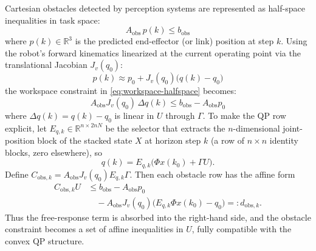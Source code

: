 Cartesian obstacles detected by perception systems are represented as
half-space inequalities in task space:
\begin{equation}
\label{eq:workspace-halfspace}
A_{\text{obs}} \, p(k) \leq b_{\text{obs}}
\end{equation}
where \(p(k) \in \mathbb{R}^3\) is the predicted end-effector (or link)
position at step \(k\). Using the robot's forward kinematics linearized
at the current operating point via the translational Jacobian
\(J_v(q_0)\):
\begin{equation}
\label{eq:fk-linearization}
p(k) \approx p_0 + J_v(q_0)\bigl(q(k) - q_0\bigr)
\end{equation}
the workspace constraint in \eqref{eq:workspace-halfspace} becomes:
\begin{equation}
\label{eq:workspace-linear-row}
A_{\text{obs}} J_v(q_0) \, \Delta q(k)
\leq b_{\text{obs}} - A_{\text{obs}} p_0
\end{equation}
where \(\Delta q(k) = q(k) - q_0\) is linear in \(U\) through
\(\Gamma\). To make the QP row explicit, let
\(E_{q,k}\in\mathbb{R}^{n\times 2nN}\) be the selector that extracts the
\(n\)-dimensional joint-position block of the stacked state \(X\) at
horizon step \(k\) (a row of \(n\times n\) identity blocks, zero
elsewhere), so
\begin{equation}
\label{eq:position-selector}
q(k)=E_{q,k}\bigl(\Phi x(k_0)+\Gamma U\bigr).
\end{equation}
Define \(C_{\text{obs},k}=A_{\text{obs}}J_v(q_0)E_{q,k}\Gamma\). Then
each obstacle row has the affine form
\begin{equation}
\label{eq:obstacle-row}
\begin{aligned}
 C_{\text{obs},k}U
&\le b_{\text{obs}}-A_{\text{obs}}p_0 \\
&\quad
-A_{\text{obs}}J_v(q_0)\bigl(E_{q,k}\Phi x(k_0)-q_0\bigr)
=: d_{\text{obs},k}.
\end{aligned}
\end{equation}
Thus the free-response term is absorbed into the right-hand side, and
the obstacle constraint becomes a set of affine inequalities in \(U\),
fully compatible with the convex QP structure.

